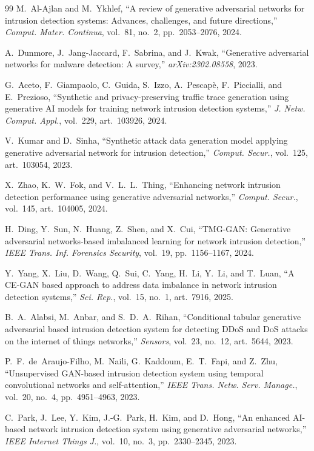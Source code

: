 \documentclass[11pt,a4paper]{article}
\begin{document}
\begin{thebibliography}{99}
 M.~Al-Ajlan and M.~Ykhlef, ``A review of generative
adversarial networks for intrusion detection systems: Advances, challenges, and
future directions,'' \emph{Comput. Mater. Continua}, vol.~81, no.~2,
pp.~2053--2076, 2024.

 A.~Dunmore, J.~Jang-Jaccard, F.~Sabrina, and J.~Kwak,
``Generative adversarial networks for malware detection: A survey,''
\emph{arXiv:2302.08558}, 2023.

 G.~Aceto, F.~Giampaolo, C.~Guida, S.~Izzo, A.~Pescap\`e,
F.~Piccialli, and E.~Prezioso, ``Synthetic and privacy-preserving traffic trace
generation using generative AI models for training network intrusion detection
systems,'' \emph{J. Netw. Comput. Appl.}, vol.~229, art.~103926, 2024.

 V.~Kumar and D.~Sinha, ``Synthetic attack data generation model
applying generative adversarial network for intrusion detection,'' \emph{Comput.
Secur.}, vol.~125, art.~103054, 2023.

 X.~Zhao, K.~W.~Fok, and V.~L.~L.~Thing, ``Enhancing network
intrusion detection performance using generative adversarial networks,''
\emph{Comput. Secur.}, vol.~145, art.~104005, 2024.

 H.~Ding, Y.~Sun, N.~Huang, Z.~Shen, and X.~Cui, ``TMG-GAN:
Generative adversarial networks-based imbalanced learning for network intrusion
detection,'' \emph{IEEE Trans. Inf. Forensics Security}, vol.~19, pp.~1156--1167,
2024.

 Y.~Yang, X.~Liu, D.~Wang, Q.~Sui, C.~Yang, H.~Li, Y.~Li, and
T.~Luan, ``A CE-GAN based approach to address data imbalance in network
intrusion detection systems,'' \emph{Sci. Rep.}, vol.~15, no.~1, art.~7916,
2025.

 B.~A.~Alabsi, M.~Anbar, and S.~D.~A.~Rihan, ``Conditional
tabular generative adversarial based intrusion detection system for detecting
DDoS and DoS attacks on the internet of things networks,'' \emph{Sensors},
vol.~23, no.~12, art.~5644, 2023.

 P.~F.~de~Araujo-Filho, M.~Naili, G.~Kaddoum, E.~T.~Fapi, and
Z.~Zhu, ``Unsupervised GAN-based intrusion detection system using temporal
convolutional networks and self-attention,'' \emph{IEEE Trans. Netw. Serv.
Manage.}, vol.~20, no.~4, pp.~4951--4963, 2023.

 C.~Park, J.~Lee, Y.~Kim, J.-G.~Park, H.~Kim, and D.~Hong, ``An
enhanced AI-based network intrusion detection system using generative
adversarial networks,'' \emph{IEEE Internet Things J.}, vol.~10, no.~3,
pp.~2330--2345, 2023.


\end{thebibliography}
\end{document}
